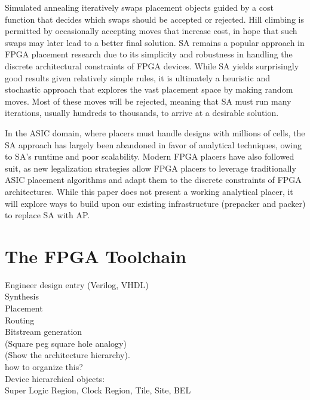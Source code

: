 \documentclass{article}
\begin{document}
\begin{multicols}{2}
    Simulated annealing iteratively swaps placement objects guided by a cost function that decides which swaps should be accepted or rejected. 
    Hill climbing is permitted by occasionally accepting moves that increase cost, in hope that such swaps may later lead to a better final solution. 
    SA remains a popular approach in FPGA placement research due to its simplicity and robustness in handling the discrete architectural constraints of FPGA devices. 
    While SA yields surprisingly good results given relatively simple rules, it is ultimately a heuristic and stochastic approach that explores the vast placement space by making random moves. 
    Most of these moves will be rejected, meaning that SA must run many iterations, usually hundreds to thousands, to arrive at a desirable solution.

    In the ASIC domain, where placers must handle designs with millions of cells, the SA approach has largely been abandoned in favor of analytical techniques, owing to SA's runtime and poor scalability. Modern FPGA placers have also followed suit, as new legalization strategies allow FPGA placers to leverage traditionally ASIC placement algorithms and adapt them to the discrete constraints of FPGA architectures. 
    While this paper does not present a working analytical placer, it will explore ways to build upon our existing infrastructure (prepacker and packer) to replace SA with AP.

\end{multicols}


\section{The FPGA Toolchain}
    Engineer design entry (Verilog, VHDL) \\
    Synthesis \\ 
    Placement \\ 
    Routing \\ 
    Bitstream generation \\ 



    (Square peg square hole analogy) \\
    (Show the architecture hierarchy). \\


    how to organize this? \\

    Device hierarchical objects: \\
        Super Logic Region, Clock Region, Tile, Site, BEL \\
\end{document}
